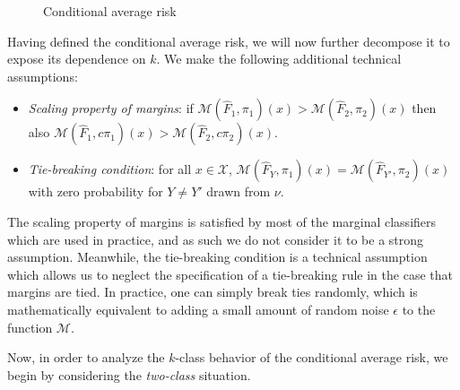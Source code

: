 \documentclass[12pt]{article}
\begin{document}

\begin{figure}[h]
\centering
\caption{Conditional average risk}\label{fig:conditional_risk}
\end{figure}

Having defined the conditional average risk, we will now further
decompose it to expose its dependence on $k$.
We make the following additional technical assumptions:
\begin{itemize}
\item 
\emph{Scaling property of margins}: if $\mathcal{M}(\hat{F}_1, \pi_1)(x) >
\mathcal{M}(\hat{F}_2, \pi_2)(x)$ then also $\mathcal{M}(\hat{F}_1,
c\pi_1)(x) > \mathcal{M}(\hat{F}_2, c\pi_2)(x)$.
\item 
\emph{Tie-breaking condition}: for all $x \in \mathcal{X}$,
$\mathcal{M}(\hat{F}_Y, \pi_1)(x) = \mathcal{M}(\hat{F}_{Y'}, \pi_2)(x)$
with zero probability for $Y \neq Y'$ drawn from $\nu$.
\end{itemize}
The scaling property of margins is satisfied by most of the marginal
classifiers which are used in practice, and as such we do not consider
it to be a strong assumption.  Meanwhile, the tie-breaking condition
is a technical assumption which allows us to neglect the specification
of a tie-breaking rule in the case that margins are tied.  In
practice, one can simply break ties randomly, which is mathematically
equivalent to adding a small amount of random noise $\epsilon$ to the
function $\mathcal{M}$.

Now, in order to analyze the $k$-class behavior of the conditional
average risk, we begin by considering the \emph{two-class} situation.
\end{document}
